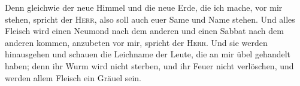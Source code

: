  Denn gleichwie der neue Himmel und die neue Erde, die
ich mache, vor mir stehen, spricht der \textsc{Herr}, also soll auch
euer Same und Name stehen.  Und alles Fleisch wird einen
Neumond nach dem anderen und einen Sabbat nach dem anderen kommen,
anzubeten vor mir, spricht der \textsc{Herr}.  Und sie
werden hinausgehen und schauen die Leichname der Leute, die an mir übel
gehandelt haben; denn ihr Wurm wird nicht sterben, und ihr Feuer nicht
verlöschen, und werden allem Fleisch ein Gräuel sein.
